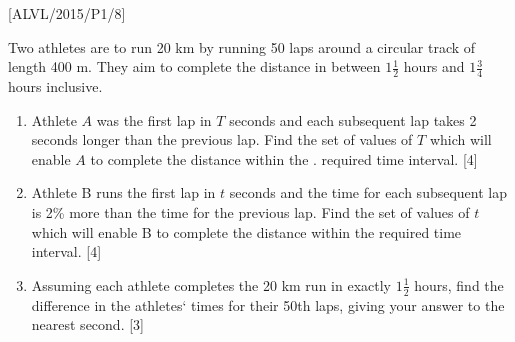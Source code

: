 \item {[}ALVL/2015/P1/8{]}

Two athletes are to run 20 km by running 50 laps around a circular
track of length 400 m. They aim to complete the distance in between
$1\frac{1}{2}$ hours and $1\frac{3}{4}$ hours inclusive.
\begin{enumerate}
\item Athlete $A$ was the first lap in $T$ seconds and each subsequent
lap takes 2 seconds longer than the previous lap. Find the set of
values of $T$ which will enable $A$ to complete the distance within
the . required time interval. \hfill{}{[}4{]}
\item Athlete B runs the first lap in $t$ seconds and the time for each
subsequent lap is 2\% more than the time for the previous lap. Find
the set of values of $t$ which will enable B to complete the distance
within the required time interval.\hfill{} {[}4{]}
\item Assuming each athlete completes the 20 km run in exactly $1\frac{1}{2}$
hours, find the difference in the athletes\textquoteleft{} times for
their 50th laps, giving your answer to the nearest second. \hfill{}{[}3{]}
\end{enumerate}

